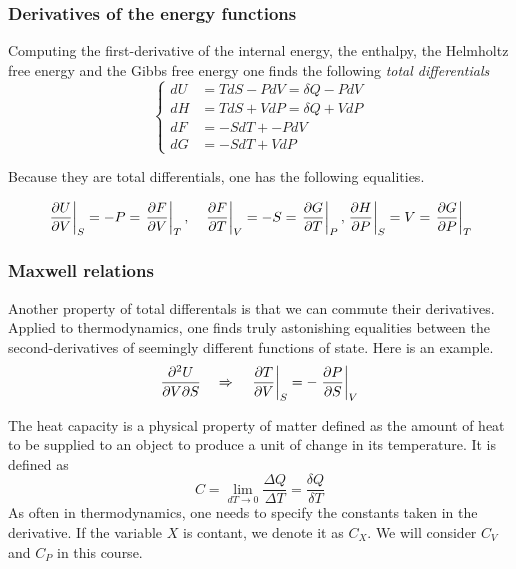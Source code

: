 \documentclass[../phys-f308.tex]{subfiles}
\begin{document}
    \subsubsection{Derivatives of the energy functions}

    Computing the first-derivative of the internal energy, the enthalpy, the Helmholtz free energy and the Gibbs free energy one finds the following \emph{total differentials}
    \begin{equation}
        \begin{cases}
            dU &= TdS-PdV = \delta Q - PdV\\
            dH &= TdS+VdP = \delta Q + VdP\\
            dF &= -SdT + -PdV\\
            dG &= -SdT + VdP
        \end{cases}
    \end{equation}

    Because they are total differentials, one has the following equalities.

    \begin{equation}
      \left.\frac{\partial U}{\partial V}\right|_{S} = -P = \left.\frac{\partial F}{\partial V}\right|_{T}, \quad \left.\frac{\partial F}{\partial T}\right|_{V} = -S = \left.\frac{\partial G}{\partial T}\right|_{P}, \left.\frac{\partial H}{\partial P}\right|_{S} = V = \left.\frac{\partial G}{\partial P}\right|_{T}
    \end{equation}

    \subsubsection{Maxwell relations}

    Another property of total differentals is that we can commute their derivatives. Applied to thermodynamics, one finds truly astonishing equalities between the second-derivatives of seemingly different functions of state. Here is an example.
    \begin{equation}
        \frac{\partial^2 U}{\partial V\partial S} \quad \Rightarrow \quad \left.\frac{\partial T}{\partial V}\right|_{S} = -\left.\frac{\partial P}{\partial S}\right|_{V}
    \end{equation}

    \begin{definition}\label{def: heat capacity}
        The heat capacity is a physical property of matter defined as the amount of heat to be supplied to an object to produce a unit of change in its temperature. It is defined as
        \begin{equation}
            C = \lim_{dT\to 0}\frac{\Delta Q}{\Delta T} = \frac{\delta Q}{\delta T}
        \end{equation}
        As often in thermodynamics, one needs to specify the constants taken in the derivative. If the variable $X$ is contant, we denote it as $C_X$. We will consider $C_V$ and $C_P$ in this course.
    \end{definition}
\end{document}
